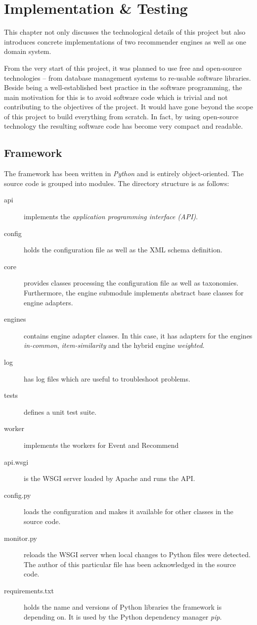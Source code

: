 \chapter{Implementation \& Testing}

This chapter not only discusses the technological details of this project but also introduces concrete implementations of two recommender engines as well as one domain system.

From the very start of this project, it was planned to use free and open-source technologies -- from database management systems to re-usable software libraries. Beside being a well-established best practice in the software programming, the main motivation for this is to avoid software code which is trivial and not contributing to the objectives of the project. It would have gone beyond the scope of this project to build everything from scratch. In fact, by using open-source technology the resulting software code has become very compact and readable.

\section{Framework}

The framework has been written in \emph{Python} and is entirely object-oriented. The source code is grouped into modules. The directory structure is as follows:

\begin{description}
    \item[api] implements the \emph{application programming interface (API)}.
    \item[config] holds the configuration file as well as the XML schema definition.
    \item[core] provides classes processing the configuration file as well as taxonomies. Furthermore, the engine submodule implements abstract base classes for engine adapters.
    \item[engines] contains engine adapter classes. In this case, it has adapters for the engines \emph{in-common}, \emph{item-similarity} and the hybrid engine \emph{weighted}.
    \item[log] has log files which are useful to troubleshoot problems.
    \item[tests] defines a unit test suite.
    \item[worker] implements the workers for Event and Recommend
    \item[api.wsgi] is the WSGI server loaded by Apache and runs the API.
    \item[config.py] loads the configuration and makes it available for other classes in the source code.
    \item[monitor.py] reloads the WSGI server when local changes to Python files were detected. The author of this particular file has been acknowledged in the source code.
    \item[requirements.txt] holds the name and versions of Python libraries the framework is depending on. It is used by the Python dependency manager \emph{pip}.
\end{description}

